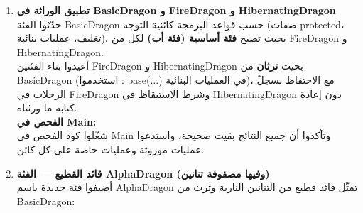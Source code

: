 \documentclass[14pt]{extarticle}
\begin{document}
\begin{enumerate}[label=\textbf{تمرين \arabic*:}, wide=0pt, leftmargin=*, itemsep=2.2em]

    \item \textbf{تطبيق الوراثة في \textenglish{BasicDragon} و \textenglish{FireDragon} و \textenglish{HibernatingDragon}} \\
    حدّثوا الفئة \textenglish{BasicDragon} حسب قواعد البرمجة كائنية التوجه (صفات \textenglish{protected}، تغليف، عمليات بنائية)، بحيث تصبح \textbf{فئة أساسية (فئة أب)} لكل من \textenglish{FireDragon} و \textenglish{HibernatingDragon}. \\
    أعيدوا بناء الفئتين \textenglish{FireDragon} و \textenglish{HibernatingDragon} بحيث \textbf{ترثان} من \textenglish{BasicDragon} (استخدموا \textenglish{: base(...)} في العمليات البنائية)، مع الاحتفاظ بسجلّ الرحلات في \textenglish{FireDragon} وشرط الاستيقاظ في \textenglish{HibernatingDragon} دون إعادة كتابة ما ورثتاه. \\
    \textbf{الفحص في \textenglish{Main}:} \\
    شغّلوا كود الفحص في \textenglish{Main} وتأكدوا أن جميع النتائج بقيت صحيحة، واستدعوا عمليات موروثة وعمليات خاصة على كل كائن.

    \item \textbf{قائد القطيع — الفئة \textenglish{AlphaDragon} (وفيها مصفوفة تنانين)} \\
    أضيفوا فئة جديدة باسم \textenglish{AlphaDragon} تمثّل قائد قطيع من التنانين النارية وترث من \textenglish{BasicDragon}:


\end{enumerate}
\end{document}
